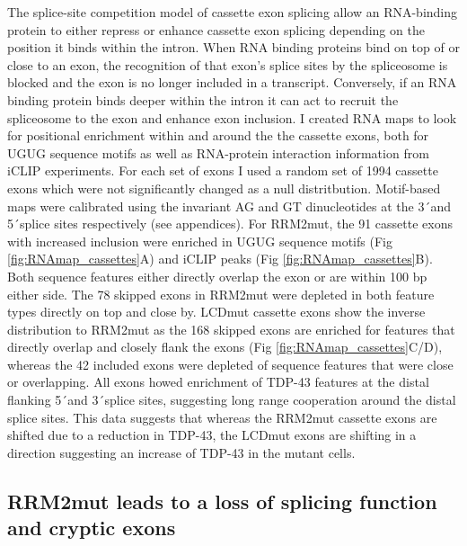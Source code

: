 The splice-site competition model of cassette exon splicing allow an RNA-binding protein to either repress or enhance cassette exon splicing depending on the position it binds within the intron. When RNA binding proteins bind on top of or close to an exon, the recognition of that exon's splice sites by the spliceosome is blocked and the exon is no longer included in a transcript. Conversely, if an RNA binding protein binds deeper within the intron it can act to recruit the spliceosome to the exon and enhance exon inclusion. 
I created RNA maps to look for positional enrichment within and around the the cassette exons, both for UGUG sequence motifs as well as RNA-protein interaction information from iCLIP experiments. For each set of exons I used a random set of 1994 cassette exons which were not significantly changed as a null distritbution.
Motif-based maps were calibrated using the invariant AG and GT dinucleotides at the 3\'\ and 5\'\ splice sites respectively (see appendices).
For RRM2mut, the 91 cassette exons with increased inclusion were enriched in UGUG sequence motifs (Fig \ref{fig:RNAmap_cassettes}A) and iCLIP peaks (Fig \ref{fig:RNAmap_cassettes}B).
Both sequence features either directly overlap the exon or are within 100 bp either side. 
The 78 skipped exons  in RRM2mut were depleted in both feature types directly on top and close by. 
LCDmut cassette exons show the inverse distribution to RRM2mut as the 168 skipped exons are enriched for features that directly overlap and closely flank the exons (Fig \ref{fig:RNAmap_cassettes}C/D), whereas the 42 included exons were depleted of sequence features that were close or overlapping.
All exons howed enrichment of TDP-43 features at the distal flanking 5\'\ and 3\'\ splice sites, suggesting long range cooperation around the distal splice sites.
This data suggests that whereas the RRM2mut cassette exons are shifted due to a reduction in TDP-43, the LCDmut exons are shifting in a direction suggesting an increase of TDP-43 in the mutant cells.



\subsection{RRM2mut leads to a loss of splicing function and cryptic exons}

